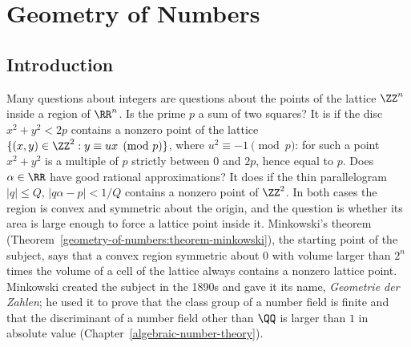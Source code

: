 \chapter{Geometry of Numbers}\label{geometry-of-numbers}

\section{Introduction}\label{geometry-of-numbers:section-introduction}

Many questions about integers are questions about the points of the lattice $\ZZ^n$ inside a region of $\RR^n$. Is the prime $p$ a sum of two squares? It is if the disc $x^2 + y^2 < 2p$ contains
a nonzero point of the lattice $\{(x, y) \in \ZZ^2 : y \equiv ux \pmod p\}$, where $u^2 \equiv -1 \pmod p$: for such a point $x^2 + y^2$ is a multiple of $p$ strictly between $0$ and $2p$, hence equal to
$p$. Does $\alpha \in \RR$ have good rational approximations? It does if the thin parallelogram $|q| \leq Q$, $|q\alpha - p| < 1/Q$ contains a nonzero point of $\ZZ^2$. In both cases the region is convex and
symmetric about the origin, and the question is whether its area is large enough to force a lattice point inside it. Minkowski's theorem (Theorem~\ref{geometry-of-numbers:theorem-minkowski}), the
starting point of the subject, says that a convex region symmetric about $0$ with volume larger than $2^n$ times the volume of a cell of the lattice always contains a nonzero lattice point. Minkowski
created the subject in the 1890s and gave it its name, \emph{Geometrie der Zahlen}; he used it to prove that the class group of a number field is finite and that the discriminant of a number field
other than $\QQ$ is larger than $1$ in absolute value (Chapter~\ref{algebraic-number-theory}).


